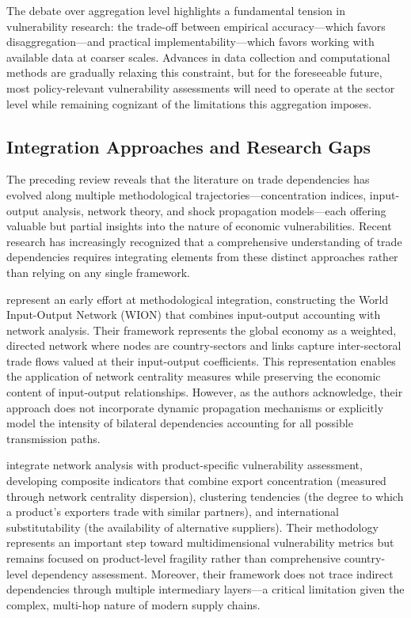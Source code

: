 \documentclass[final,1p,times,authoryear]{elsarticle}
\begin{document}
The debate over aggregation level highlights a fundamental tension in vulnerability research: the trade-off between empirical accuracy—which favors disaggregation—and practical implementability—which favors working with available data at coarser scales. Advances in data collection and computational methods are gradually relaxing this constraint, but for the foreseeable future, most policy-relevant vulnerability assessments will need to operate at the sector level while remaining cognizant of the limitations this aggregation imposes.
\subsection{Integration Approaches and Research Gaps}

The preceding review reveals that the literature on trade dependencies has evolved along multiple methodological trajectories—concentration indices, input-output analysis, network theory, and shock propagation models—each offering valuable but partial insights into the nature of economic vulnerabilities. Recent research has increasingly recognized that a comprehensive understanding of trade dependencies requires integrating elements from these distinct approaches rather than relying on any single framework.

\cite{Cerina2015} represent an early effort at methodological integration, constructing the World Input-Output Network (WION) that combines input-output accounting with network analysis. Their framework represents the global economy as a weighted, directed network where nodes are country-sectors and links capture inter-sectoral trade flows valued at their input-output coefficients. This representation enables the application of network centrality measures while preserving the economic content of input-output relationships. However, as the authors acknowledge, their approach does not incorporate dynamic propagation mechanisms or explicitly model the intensity of bilateral dependencies accounting for all possible transmission paths.

\cite{Korniyenko2017} integrate network analysis with product-specific vulnerability assessment, developing composite indicators that combine export concentration (measured through network centrality dispersion), clustering tendencies (the degree to which a product's exporters trade with similar partners), and international substitutability (the availability of alternative suppliers). Their methodology represents an important step toward multidimensional vulnerability metrics but remains focused on product-level fragility rather than comprehensive country-level dependency assessment. Moreover, their framework does not trace indirect dependencies through multiple intermediary layers—a critical limitation given the complex, multi-hop nature of modern supply chains.
\end{document}
